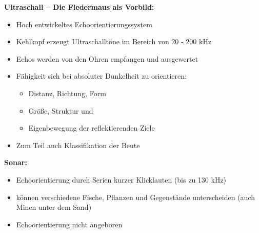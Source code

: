 \textbf{Ultraschall – Die Fledermaus als Vorbild:}
\begin{itemize}
\setlength\itemsep{0em}
\item Hoch entwickeltes Echoorientierungssystem
\item Kehlkopf erzeugt Ultraschalltöne im Bereich von 20 - 200 kHz
\item Echos werden von den Ohren empfangen und ausgewertet
\item Fähigkeit sich bei absoluter Dunkelheit zu orientieren:
\begin{itemize}
\setlength\itemsep{0em}
\item Distanz, Richtung, Form
\item Größe, Struktur und
\item Eigenbewegung der reflektierenden Ziele
\end{itemize}
\item Zum Teil auch Klassifikation der Beute
\end{itemize}
\textbf{Sonar:}
\begin{itemize}
\setlength\itemsep{0em}
\item Echoorientierung durch Serien kurzer Klicklauten (bis zu 130 kHz)
\item können verschiedene Fische, Pflanzen und Gegenstände unterscheiden (auch Minen unter dem Sand)
\item Echoorientierung nicht angeboren
\end{itemize}

